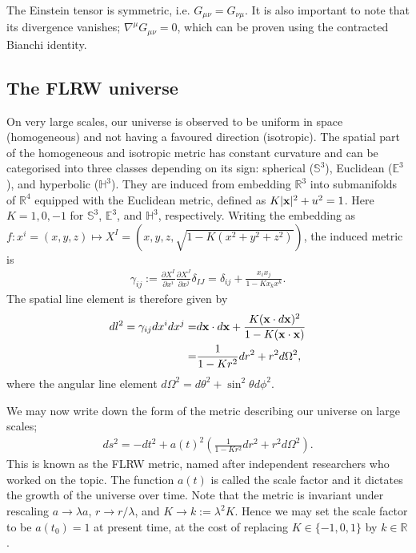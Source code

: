 The Einstein tensor is symmetric, i.e. $G_{\mu\nu} = G_{\nu\mu}$. It is also important to note that its divergence vanishes; $\nabla^\mu G_{\mu\nu} = 0$, which can be proven using the contracted Bianchi identity.


\subsection{The FLRW universe}
On very large scales, our universe is observed to be uniform in space (homogeneous) and not having a favoured direction (isotropic). The spatial part of the homogeneous and isotropic metric has constant curvature and can be categorised into three classes depending on its sign: spherical ($\mathbb{S}^3$), Euclidean ($\mathbb{E}^3$), and hyperbolic ($\mathbb{H}^3$). They are induced from embedding $\mathbb{R}^3$ into submanifolds of $\mathbb{R}^4$ equipped with the Euclidean metric, defined as $K|\mathbf{x}|^2 + u^2 = 1$. Here $K=1,0,-1$ for $\mathbb{S}^3$, $\mathbb{E}^3$, and $\mathbb{H}^3$, respectively. Writing the embedding as $f: x^i = (x,y,z) \mapsto X^I =(x,y,z,\sqrt{1-K(x^2+y^2+z^2)})$, the induced metric is
\begin{align}
	\gamma_{ij} := \frac{\partial X^I}{\partial x^i} \frac{\partial X^J}{\partial x^j} \delta_{IJ}
	= \delta_{ij} + \frac{x_i x_j}{1-Kx_k x^k}. \label{eqn:FLRW_metric_spatial}
\end{align}
The spatial line element is therefore given by
\begin{align}
	dl^2 = \gamma_{ij} dx^i dx^j =& d\mathbf{x} \cdot d\mathbf{x} + \frac{K(\mathbf{x} \cdot d\mathbf{x})^2}{1-K (\mathbf{x} \cdot \mathbf{x})} \\
	=& \frac{1}{1-Kr^2} dr^2 + r^2 d\Omega^2,
\end{align}
where the angular line element $d\Omega^2 = d\theta^2 + \sin^2\theta d\phi^2$.

We may now write down the form of the metric describing our universe on large scales;
\begin{align}
	ds^2 = - dt^2 + a(t)^2 \left( \frac{1}{1-Kr^2} dr^2 + r^2 d\Omega^2 \right).
\end{align}
This is known as the FLRW metric, named after independent researchers who worked on the topic. The function $a(t)$ is called the scale factor and it dictates the growth of the universe over time. Note that the metric is invariant under rescaling $a \rightarrow \lambda a$, $r \rightarrow r / \lambda$, and $K \rightarrow k:= \lambda^2 K$. Hence we may set the scale factor to be $a(t_0) = 1$ at present time, at the cost of replacing $K \in \{-1,0,1\}$ by $k \in \mathbb{R}$.

